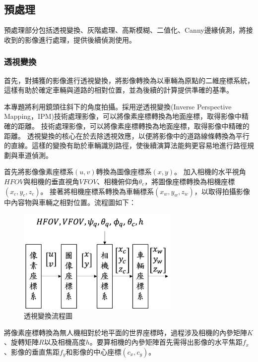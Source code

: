 \documentclass[12pt]{article}       %
\begin{document}

\subsection{預處理} 
\hspace{2em}預處理部分包括透視變換、灰階處理、高斯模糊、二值化、Canny邊緣偵測，將接收到的影像進行處理，提供後續偵測使用。


\subsubsection{透視變換}
\hspace{2em}首先，對捕獲的影像進行透視變換，將影像轉換為以車輛為原點的二維座標系統，這樣有助於確定車輛與道路的相對位置，並為後續的計算提供準確的基準。

本專題將利用鏡頭往斜下的角度拍攝。採用逆透視變換(Inverse Perspective Mapping，IPM)\cite{lin_2001}\cite{bertozz1998stereo}\cite{mallot1991inverse}技術處理影像，可以將像素座標轉換為地面座標，取得影像中精確的距離。
技術處理影像，可以將像素座標轉換為地面座標，取得影像中精確的距離。
透視變換的核心在於去除透視效應，以便將影像中的道路線條轉換為平行的直線。這樣的變換有助於車輛識別路徑，使後續演算法能夠更容易地進行路徑規劃與車道偵測。

首先將影像像素座標系$(u,v)$轉換為圖像座標系$(x,y)$。
加入相機的水平視角$HFOV$與相機的垂直視角$VFOV$、相機俯仰角$\theta_{c}$，將圖像座標轉換為相機座標$(x_{c},y_{c},z_{c})$。
接著將相機座標系轉換為車輛標系$(x_w,y_w,z_w)$，以取得拍攝影像中內容物與車輛之相對位置。流程圖如下：
\begin{figure}[H]
    \centering
    \includegraphics[width=0.7\textwidth]{123.png}     %
    \caption{透視變換流程圖}    %
    \label{fig:123}    %
\end{figure}
將像素座標轉換為無人機相對於地平面的世界座標時，過程涉及相機的內參矩陣$K$、旋轉矩陣$R$以及相機高度$h$。要算相機的內參矩陣首先需得出影像的水平焦距$f_{x}$、影像的垂直焦距$f_{y}$和影像的中心座標$(c_x,c_y)$。
\end{document}
